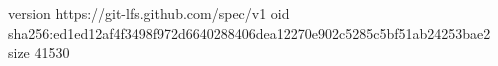 version https://git-lfs.github.com/spec/v1
oid sha256:ed1ed12af4f3498f972d6640288406dea12270e902c5285c5bf51ab24253bae2
size 41530
